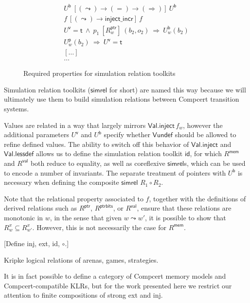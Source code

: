 \documentclass[acmsmall,anonymous]{acmart}
\newcommand{\kw}[1]{\ensuremath{ \textsf{#1} }}
\newcommand{\ifr}[1]{\ [{#1}]\ }
\begin{document}
\begin{figure}
  \begin{gather*}
    U^\kw{b} \ifr{(\leadsto) \rightarrow (=) \rightarrow (\Rightarrow)} U^\kw{b} \\
    f \ifr{(\leadsto) \rightarrow \kw{inject\_incr}} f \\
    U^\kw{v} = \kw{t} \ \wedge\  p_1 \ifr{R^\kw{ptr}_w} (b_2, o_2) \ \Rightarrow\  U^\kw{b}_w(b_2) \\
    U^\kw{p}_w(b_2) \ \Rightarrow\  U^\kw{v} = \kw{t} \\
    [\ldots] \\
    \ldots
  \end{gather*}
  \label{fig:simrelprop}
  \caption{Required properties for simulation relation toolkits}
\end{figure}

Simulation relation toolkits (\kw{simrel} for short)
are named this way because we will ultimately
use them to build simulation relations between
Compcert transition systems.

Values are related in a way that largely mirrors $\kw{Val.inject}\,f_w$,
however the additional parameters $U^\kw{v}$ and $U^\kw{b}$
specify whether $\kw{Vundef}$ should be allowed to refine defined values.
The ability to switch off this behavior of \kw{Val.inject} and \kw{Val.lessdef}
allows us to define the simulation relation toolkit \kw{id},
for which $R^\kw{mem}$ and $R^\kw{val}$ both reduce to equality,
as well as coreflexive \kw{simrel}s,
which can be used to encode a number of invariants.
The separate treatment of pointers with $U^\kw{b}$
is necessary when defining the composite \kw{simrel} $R_1 \circ R_2$.

Note that the relational property associated to $f$,
together with the definitions of
derived relations such as $R^\kw{ptr}$, $R^\kw{ptrbits}$, or $R^\kw{val}$,
ensure that these relations are monotonic in $w$,
in the sense that given $w \leadsto w'$,
it is possible to show that $R^x_w \subseteq R^x_{w'}$.
However,
this is not necessarily the case for $R^\kw{mem}$.



[Define inj, ext, id, $\circ$.]


Kripke logical relations of arenas, games, strategies.

It is in fact possible to define a
category of Compcert memory models and Compcert-compatible KLRs,
but for the work presented here we restrict our attention
to finite compositions of strong \textsf{ext} and \textsf{inj}.
\end{document}
